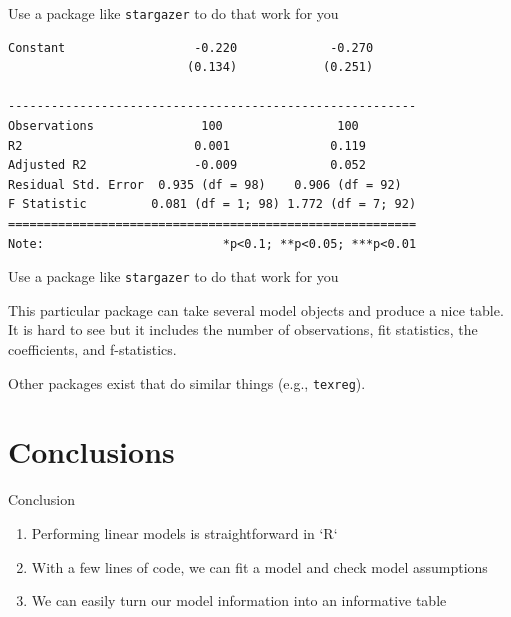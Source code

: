 \begin{frame}[fragile]{Use a package like \texttt{stargazer} to do that
work for you}
\begin{verbatim}
Constant                  -0.220             -0.270      
                         (0.134)            (0.251)      
                                                         
---------------------------------------------------------
Observations               100                100        
R2                        0.001              0.119       
Adjusted R2               -0.009             0.052       
Residual Std. Error  0.935 (df = 98)    0.906 (df = 92)  
F Statistic         0.081 (df = 1; 98) 1.772 (df = 7; 92)
=========================================================
Note:                         *p<0.1; **p<0.05; ***p<0.01
\end{verbatim}

\end{frame}

\begin{frame}[fragile]{Use a package like \texttt{stargazer} to do that
work for you}

This particular package can take several model objects and produce a
nice table. It is hard to see but it includes the number of
observations, fit statistics, the coefficients, and f-statistics.

Other packages exist that do similar things (e.g., \texttt{texreg}).

\begin{Shaded}
\begin{Highlighting}[]
\NormalTok{(}
\end{Highlighting}
\end{Shaded}

\end{frame}

\section{Conclusions}\label{conclusions}

\begin{frame}{Conclusion}

\Large

\begin{enumerate}
\item Performing linear models is straightforward in `R`
\item With a few lines of code, we can fit a model and check model assumptions
\item We can easily turn our model information into an informative table
\end{enumerate}

\end{frame}

